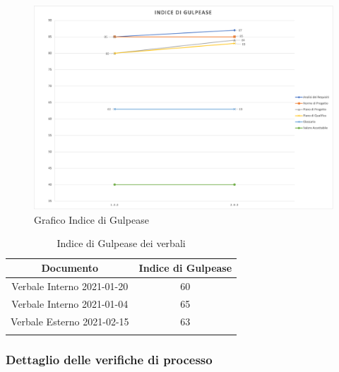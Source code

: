 \begin{center}
    \begin{figure}[!htb]
        \centering
        \includegraphics[scale=0.60]{res/images/RPgulpease.png}
        \caption{Grafico Indice di Gulpease}
    \end{figure}
    \begin{center}
        \begin{longtable}{|c|c|}
            \hline
            \rowcolor{lighter-grayer}
            \textbf{Documento}         & \textbf{Indice di Gulpease} \\
            \hline
            \endfirsthead

            \hline
            Verbale Interno 2021-01-20 & 60                          \\
            Verbale Interno 2021-01-04 & 65                          \\     
            Verbale Esterno 2021-02-15 & 63                          \\           
            \hline
            \rowcolor{white}
            \caption{Indice di Gulpease dei verbali}
        \end{longtable}
    \end{center}
\end{center}

\subsubsection{Dettaglio delle verifiche di processo}


